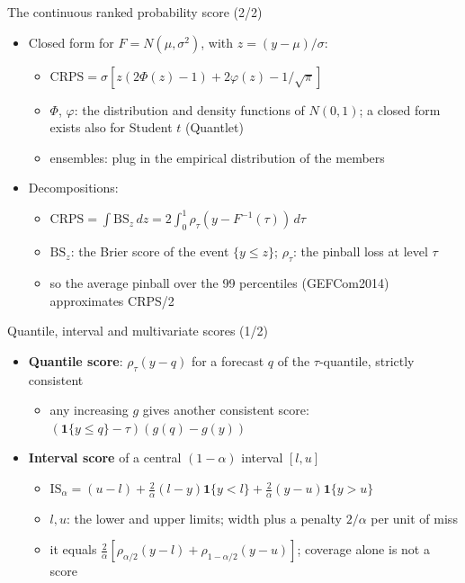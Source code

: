 \begin{frame}{The continuous ranked probability score (2/2)}
\itemsize{\small}
\begin{itemize}
    \item Closed form for $F = N(\mu, \sigma^2)$, with $z = (y - \mu)/\sigma$:
    \begin{itemize}
        \item $\mathrm{CRPS} = \sigma\left[z(2\Phi(z) - 1) + 2\varphi(z) - 1/\sqrt\pi\right]$
        \item $\Phi$, $\varphi$: the distribution and density functions of $N(0,1)$; a closed form exists also for Student $t$ (Quantlet)
        \item ensembles: plug in the empirical distribution of the members
    \end{itemize}
    \item Decompositions:
    \begin{itemize}
        \item $\mathrm{CRPS} = \int \mathrm{BS}_z\,dz = 2\int_0^1 \rho_\tau(y - F^{-1}(\tau))\,d\tau$
        \item $\mathrm{BS}_z$: the Brier score of the event $\{y \le z\}$; $\rho_\tau$: the pinball loss at level $\tau$
        \item so the average pinball over the 99 percentiles (GEFCom2014) approximates CRPS/2 
    \end{itemize}
\end{itemize}
\end{frame}

\begin{frame}{Quantile, interval and multivariate scores (1/2)}
\itemsize{\small}
\begin{itemize}
    \item \textbf{Quantile score}: $\rho_\tau(y - q)$ for a forecast $q$ of the $\tau$-quantile, strictly consistent 
    \begin{itemize}
        \item any increasing $g$ gives another consistent score: $(\mathbf 1\{y \le q\} - \tau)(g(q) - g(y))$
    \end{itemize}
    \item \textbf{Interval score} of a central $(1 - \alpha)$ interval $[l, u]$ 
    \begin{itemize}
        \item $\mathrm{IS}_\alpha = (u - l) + \frac2\alpha(l - y)\mathbf 1\{y < l\} + \frac2\alpha(y - u)\mathbf 1\{y > u\}$
        \item $l, u$: the lower and upper limits; width plus a penalty $2/\alpha$ per unit of miss
        \item it equals $\frac2\alpha[\rho_{\alpha/2}(y - l) + \rho_{1 - \alpha/2}(y - u)]$; coverage alone is not a score
    \end{itemize}
\end{itemize}
\end{frame}


